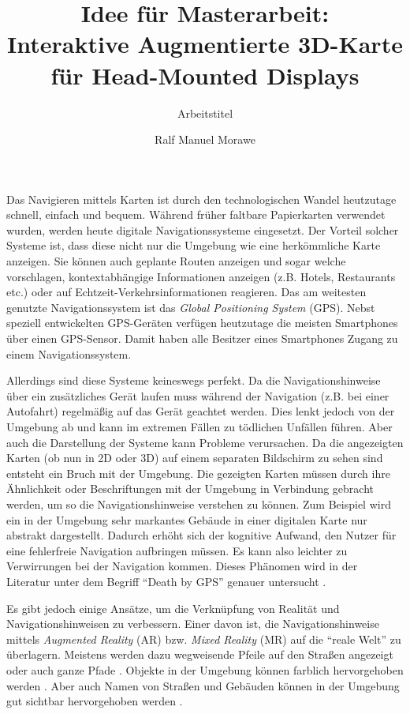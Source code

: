 \documentclass[a4paper]{scrartcl}
\begin{document}
	
\author{Ralf Manuel Morawe}
\title{Idee für Masterarbeit:\\ Interaktive Augmentierte 3D-Karte für Head-Mounted Displays}
\subtitle{Arbeitstitel}
\maketitle

Das Navigieren mittels Karten ist durch den technologischen Wandel heutzutage schnell, einfach und bequem.
Während früher faltbare Papierkarten verwendet wurden, werden heute digitale Navigationssysteme eingesetzt.
Der Vorteil solcher Systeme ist, dass diese nicht nur die Umgebung wie eine herkömmliche Karte anzeigen.
Sie können auch geplante Routen anzeigen und sogar welche vorschlagen, kontextabhängige Informationen anzeigen (z.B. Hotels, Restaurants etc.) oder auf Echtzeit-Verkehrsinformationen reagieren.
Das am weitesten genutzte Navigationssystem ist das \emph{Global Positioning System} (GPS).
Nebst speziell entwickelten GPS-Geräten verfügen heutzutage die meisten Smartphones über einen GPS-Sensor.
Damit haben alle Besitzer eines Smartphones Zugang zu einem Navigationssystem.

Allerdings sind diese Systeme keineswegs perfekt.
Da die Navigationshinweise über ein zusätzliches Gerät laufen muss während der Navigation (z.B. bei einer Autofahrt) regelmäßig auf das Gerät geachtet werden.
Dies lenkt jedoch von der Umgebung ab und kann im extremen Fällen zu tödlichen Unfällen führen.
Aber auch die Darstellung der Systeme kann Probleme verursachen.
Da die angezeigten Karten (ob nun in 2D oder 3D) auf einem separaten Bildschirm zu sehen sind entsteht ein Bruch mit der Umgebung.
Die gezeigten Karten müssen durch ihre Ähnlichkeit oder Beschriftungen mit der Umgebung in Verbindung gebracht werden, um so die Navigationshinweise verstehen zu können.
Zum Beispiel wird ein in der Umgebung sehr markantes Gebäude in einer digitalen Karte nur abstrakt dargestellt.
Dadurch erhöht sich der kognitive Aufwand, den Nutzer für eine fehlerfreie Navigation aufbringen müssen.
Es kann also leichter zu Verwirrungen bei der Navigation kommen.
Dieses Phänomen wird in der Literatur unter dem Begriff \enquote{Death by GPS} genauer untersucht \autocite{Lin2017}.

Es gibt jedoch einige Ansätze, um die Verknüpfung von Realität und Navigationshinweisen zu verbessern.
Einer davon ist, die Navigationshinweise mittels \emph{Augmented Reality} (AR) bzw. \emph{Mixed Reality} (MR) auf die \enquote{reale Welt} zu überlagern.
Meistens werden dazu wegweisende Pfeile auf den Straßen angezeigt \autocites{Bark2014}{Alnabhan2014} oder auch ganze Pfade \autocites{Hoellerer1999}{Reitmayr2004}{Kim2009}.
Objekte in der Umgebung können farblich hervorgehoben werden \autocites{Mulloni2011a}.
Aber auch Namen von Straßen und Gebäuden können in der Umgebung gut sichtbar hervorgehoben werden \autocite[25\psq]{Lodts2015}.
\end{document}
